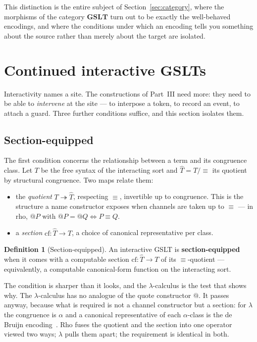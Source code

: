 \documentclass[11pt]{article}
\theoremstyle{definition}
\newtheorem{definition}{Definition}[section]
\theoremstyle{plain}
\theoremstyle{remark}
\newcommand{\GSLT}{\mathbf{GSLT}}
\newcommand{\cf}{\mathrm{cf}}
\begin{document}
This distinction is the entire subject of Section~\ref{sec:category}, where the
morphisms of the category $\GSLT$ turn out to be exactly the well-behaved encodings, and
where the conditions under which an encoding tells you something about the source rather
than merely about the target are isolated.

\section{Continued interactive GSLTs}
\label{sec:continued}

Interactivity names a site. The constructions of Part~III need more: they need to be
able to \emph{intervene} at the site --- to interpose a token, to record an event, to
attach a guard. Three further conditions suffice, and this section isolates them.

\subsection{Section-equipped}

The first condition concerns the relationship between a term and its congruence class.
Let $T$ be the free syntax of the interacting sort and $\widehat{T} = T/{\equiv}$ its
quotient by structural congruence. Two maps relate them:

\begin{itemize}[leftmargin=2em]
  \item the \emph{quotient} $T \twoheadrightarrow \widehat{T}$, respecting $\equiv$,
    invertible up to congruence. This is the structure a name constructor exposes when
    channels are taken up to $\equiv$ --- in rho, $@P$ with $@P = @Q \iff P \equiv Q$.
  \item a \emph{section} $\cf : \widehat{T} \to T$, a choice of canonical representative
    per class.
\end{itemize}

\begin{definition}[Section-equipped]
\label{def:section}
An interactive GSLT is \textbf{section-equipped} when it comes with a computable section
$\cf : \widehat{T} \to T$ of its $\equiv$-quotient --- equivalently, a computable
canonical-form function on the interacting sort.
\end{definition}

The condition is sharper than it looks, and the $\lambda$-calculus is the test that
shows why. The $\lambda$-calculus has no analogue of the quote constructor $@$. It
passes anyway, because what is required is not a channel constructor but a section: for
$\lambda$ the congruence is $\alpha$ and a canonical representative of each
$\alpha$-class is the de Bruijn encoding~\cite{deBruijn1972}. Rho fuses the quotient and
the section into one operator viewed two ways; $\lambda$ pulls them apart; the
requirement is identical in both.
\end{document}
